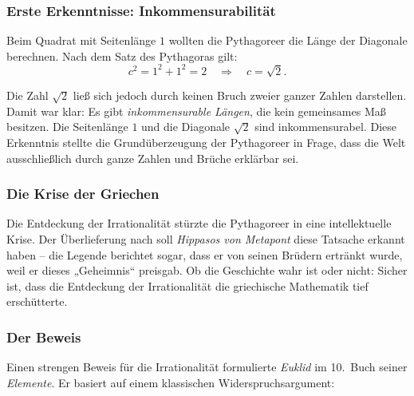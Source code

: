 \subsubsection*{Erste Erkenntnisse: Inkommensurabilität}
Beim Quadrat mit Seitenlänge $1$ wollten die Pythagoreer die Länge der Diagonale berechnen. 
Nach dem Satz des Pythagoras gilt:
\[
c^2 = 1^2 + 1^2 = 2 \quad \Rightarrow \quad c = \sqrt{2}.
\]

Die Zahl $\sqrt{2}$ ließ sich jedoch durch keinen Bruch zweier ganzer Zahlen darstellen. 
Damit war klar: Es gibt \emph{inkommensurable Längen}, 
die kein gemeinsames Maß besitzen. 
Die Seitenlänge $1$ und die Diagonale $\sqrt{2}$ sind inkommensurabel.
Diese Erkenntnis stellte die Grundüberzeugung der Pythagoreer in Frage, 
dass die Welt ausschließlich durch ganze Zahlen und Brüche erklärbar sei.

\subsubsection*{Die Krise der Griechen}
Die Entdeckung der Irrationalität stürzte die Pythagoreer in eine intellektuelle Krise.  
Der Überlieferung nach soll \emph{Hippasos von Metapont} 
diese Tatsache erkannt haben – 
die Legende berichtet sogar, dass er von seinen Brüdern ertränkt wurde, 
weil er dieses „Geheimnis“ preisgab. 
Ob die Geschichte wahr ist oder nicht: 
Sicher ist, dass die Entdeckung der Irrationalität 
die griechische Mathematik tief erschütterte. 

\subsubsection*{Der Beweis}
Einen strengen Beweis für die Irrationalität formulierte \emph{Euklid} 
im 10.~Buch seiner \emph{Elemente}. 
Er basiert auf einem klassischen Widerspruchsargument:


